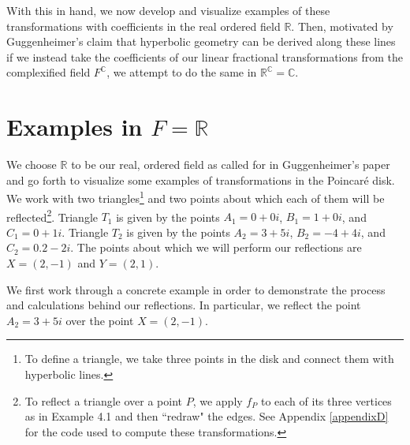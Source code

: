 \documentclass[12pt]{article}
\newcommand{\R}{\mathbb{R}}
\newcommand{\C}{\mathbb{C}}
\newcommand{\fc}{F^{\C}}
\newcommand{\poincare}{Poincar\'{e} }
\theoremstyle{plain}
\theoremstyle{definition}
\begin{document}
With this in hand, we now develop and visualize examples of these transformations with coefficients in the real ordered field $\R$. Then, motivated by Guggenheimer's claim that hyperbolic geometry can be derived along these lines if we instead take the coefficients of our linear fractional transformations from the complexified field $\fc$, we attempt to do the same in $\R^{\C} = \C$. 



\section{Examples in $F = \R$}

\hspace{10mm} We choose $\R$ to be our real, ordered field as called for in Guggenheimer's paper and go forth to visualize some examples of transformations in the \poincare disk. We work with two triangles\footnote{To define a triangle, we take three points in the disk and connect them with hyperbolic lines.} and two points about which each of them will be reflected\footnote{To reflect a triangle over a point $P$, we apply $f_P$ to each of its three vertices as in Example 4.1 and then ``redraw" the edges. See Appendix \ref{appendixD} for the code used to compute these transformations.}. Triangle $T_1$ is given by the points $A_1 = 0 + 0i$, $B_1 = 1 + 0i$, and $C_1 = 0 + 1i$. Triangle $T_2$ is given by the points $A_2 = 3 + 5i$, $B_2 = -4 + 4i$, and $C_2 = 0.2 - 2i$. The points about which we will perform our reflections are $X = (2, -1)$ and $Y = (2, 1)$.

We first work through a concrete example in order to demonstrate the process and calculations behind our reflections. In particular, we reflect the point $A_2 = 3+5i$ over the point $X = (2, -1)$.
\end{document}
